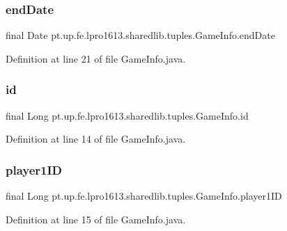 \subsubsection{\texorpdfstring{end\+Date}{endDate}}
{\footnotesize\ttfamily final Date pt.\+up.\+fe.\+lpro1613.\+sharedlib.\+tuples.\+Game\+Info.\+end\+Date}



Definition at line 21 of file Game\+Info.\+java.

\hypertarget{classpt_1_1up_1_1fe_1_1lpro1613_1_1sharedlib_1_1tuples_1_1_game_info_a09391412307fc262741c17fd850c8f4a}{}\label{classpt_1_1up_1_1fe_1_1lpro1613_1_1sharedlib_1_1tuples_1_1_game_info_a09391412307fc262741c17fd850c8f4a} 
\subsubsection{\texorpdfstring{id}{id}}
{\footnotesize\ttfamily final Long pt.\+up.\+fe.\+lpro1613.\+sharedlib.\+tuples.\+Game\+Info.\+id}



Definition at line 14 of file Game\+Info.\+java.

\hypertarget{classpt_1_1up_1_1fe_1_1lpro1613_1_1sharedlib_1_1tuples_1_1_game_info_a4bfc686de26be1a765aef31922211cb5}{}\label{classpt_1_1up_1_1fe_1_1lpro1613_1_1sharedlib_1_1tuples_1_1_game_info_a4bfc686de26be1a765aef31922211cb5} 
\subsubsection{\texorpdfstring{player1\+ID}{player1ID}}
{\footnotesize\ttfamily final Long pt.\+up.\+fe.\+lpro1613.\+sharedlib.\+tuples.\+Game\+Info.\+player1\+ID}



Definition at line 15 of file Game\+Info.\+java.

\hypertarget{classpt_1_1up_1_1fe_1_1lpro1613_1_1sharedlib_1_1tuples_1_1_game_info_a413baca7d49fe7f174d23340cedbacae}{}\label{classpt_1_1up_1_1fe_1_1lpro1613_1_1sharedlib_1_1tuples_1_1_game_info_a413baca7d49fe7f174d23340cedbacae} 
